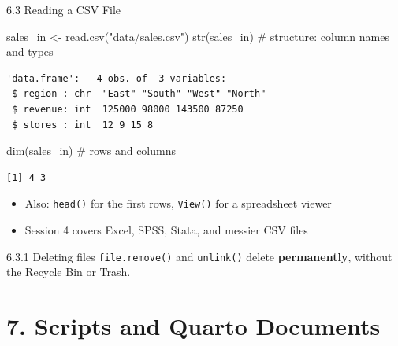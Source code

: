\documentclass[
  ignorenonframetext,
  aspectratio=169,
]{beamer}
\newenvironment{Shaded}{\begin{snugshade}}{\end{snugshade}}
\newcommand{\CommentTok}[1]{\textcolor[rgb]{0.37,0.37,0.37}{#1}}
\newcommand{\FunctionTok}[1]{\textcolor[rgb]{0.28,0.35,0.67}{#1}}
\newcommand{\NormalTok}[1]{\textcolor[rgb]{0.00,0.23,0.31}{#1}}
\newcommand{\OtherTok}[1]{\textcolor[rgb]{0.00,0.23,0.31}{#1}}
\newcommand{\StringTok}[1]{\textcolor[rgb]{0.13,0.47,0.30}{#1}}
\providecommand{\tightlist}{%
  \setlength{\itemsep}{0pt}\setlength{\parskip}{0pt}}
\begin{document}
\begin{frame}[fragile]{6.3 Reading a CSV File}
\protect{}\label{reading-a-csv-file}
\begin{Shaded}
\begin{Highlighting}[]
\NormalTok{sales\_in }\OtherTok{\textless{}{-}} \FunctionTok{read.csv}\NormalTok{(}\StringTok{"data/sales.csv"}\NormalTok{)}
\FunctionTok{str}\NormalTok{(sales\_in)        }\CommentTok{\# structure: column names and types}
\end{Highlighting}
\end{Shaded}

\begingroup\tiny\color{darkgray}

\begin{verbatim}
'data.frame':   4 obs. of  3 variables:
 $ region : chr  "East" "South" "West" "North"
 $ revenue: int  125000 98000 143500 87250
 $ stores : int  12 9 15 8
\end{verbatim}

\endgroup

\begin{Shaded}
\begin{Highlighting}[]
\FunctionTok{dim}\NormalTok{(sales\_in)        }\CommentTok{\# rows and columns}
\end{Highlighting}
\end{Shaded}

\begingroup\tiny\color{darkgray}

\begin{verbatim}
[1] 4 3
\end{verbatim}

\endgroup

\begin{itemize}
\tightlist
\item
  Also: \texttt{head()} for the first rows, \texttt{View()} for a
  spreadsheet viewer
\item
  Session 4 covers Excel, SPSS, Stata, and messier CSV files
\end{itemize}

\begin{alertblock}{6.3.1 Deleting files}
\protect{}\label{deleting-files}
\texttt{file.remove()} and \texttt{unlink()} delete
\textbf{permanently}, without the Recycle Bin or Trash.
\end{alertblock}
\end{frame}

\section{7. Scripts and Quarto Documents}\label{sec-quarto}
\end{document}
